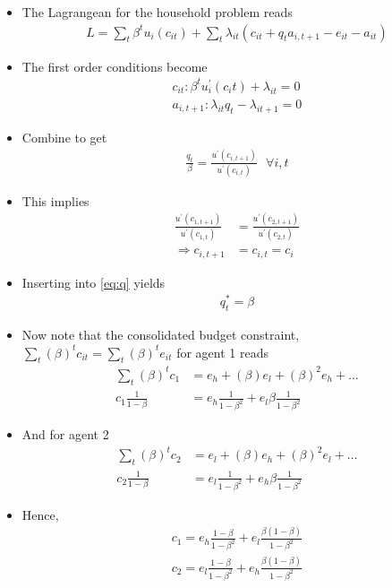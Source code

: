 \documentclass{scrartcl}
\begin{document}
\begin{itemize}
	\item The Lagrangean for the household problem reads
	\begin{align}
	L=\sum_{t} \beta^t u_{i} (c_{it})+\sum_t \lambda_{it} \left( c_{it}+q_t a_{i,t+1}-e_{it}-a_{it}\right)
	\end{align}
	\item The first order conditions become
	\begin{align}
	c_{it}: \beta^t u^\prime_i(c_it)+\lambda_{it}=0 \\
	a_{i,t+1}: \lambda_{it} q_t - \lambda_{it+1}=0
	\end{align}
	\item Combine to get
	\begin{align}
	\frac{q_t}{\beta}=\frac{u^\prime(c_{i,t+1})}{u^\prime(c_{i,t})} \text{ } \forall i,t \label{eq:q}
	\end{align}
	\item This implies 
	\begin{align}
	\frac{u^\prime(c_{1,t+1})}{u^\prime(c_{1,t})}&=	\frac{u^\prime(c_{2,t+1})}{u^\prime(c_{2,t})} \\
	\Rightarrow c_{i,t+1}&=c_{i,t}=c_i
	\end{align}
	\item Inserting into \eqref{eq:q} yields 
	\begin{align}
	q_t^*=\beta
	\end{align}
	\item Now note that the consolidated budget constraint, $\sum_t \left( \beta \right)^t c_{it}=\sum_t \left( \beta \right)^t e_{it}$ for agent 1 reads
	\begin{align}
	\sum_t \left( \beta \right)^t c_{1}&=e_h+\left( \beta \right)e_l+\left( \beta \right)^2e_h+\dots \\
	c_{1}\frac{1}{1-\beta}&=e_h\frac{1}{1-\beta^2}+e_l\beta\frac{1}{1-\beta^2}
	\end{align}
\item And for agent 2
	\begin{align}
	\sum_t \left( \beta \right)^t c_{2}&=e_l+\left( \beta \right)e_h+\left( \beta \right)^2e_l+\dots \\
	c_{2}\frac{1}{1-\beta}&=e_l\frac{1}{1-\beta^2}+e_h\beta\frac{1}{1-\beta^2}
	\end{align}
	\item Hence,
		\begin{align}
		c_{1}=e_h\frac{1-\beta}{1-\beta^2}+e_l\frac{\beta(1-\beta)}{1-\beta^2} \\
		c_{2}=e_l\frac{1-\beta}{1-\beta^2}+e_h\frac{\beta(1-\beta)}{1-\beta^2} 
		\end{align}
	

\end{itemize}
\end{document}
